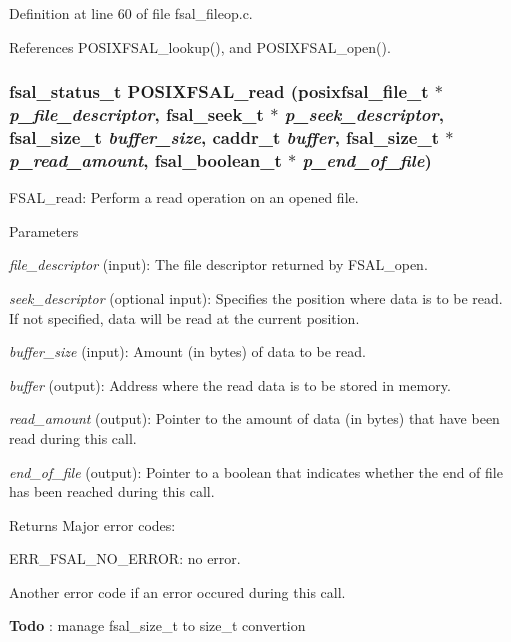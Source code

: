 Definition at line 60 of file fsal\_\-fileop.c.

References POSIXFSAL\_\-lookup(), and POSIXFSAL\_\-open().
\subsubsection[{POSIXFSAL\_\-read}]{\setlength{\rightskip}{0pt plus 5cm}fsal\_\-status\_\-t POSIXFSAL\_\-read (posixfsal\_\-file\_\-t $\ast$ {\em p\_\-file\_\-descriptor}, \/  fsal\_\-seek\_\-t $\ast$ {\em p\_\-seek\_\-descriptor}, \/  fsal\_\-size\_\-t {\em buffer\_\-size}, \/  caddr\_\-t {\em buffer}, \/  fsal\_\-size\_\-t $\ast$ {\em p\_\-read\_\-amount}, \/  fsal\_\-boolean\_\-t $\ast$ {\em p\_\-end\_\-of\_\-file})}\label{fsal__fileop_8c_adbed54d9e06272c3baad10998c2d51cf}
FSAL\_\-read: Perform a read operation on an opened file.


\begin{DoxyParams}{Parameters}
\item[{\em file\_\-descriptor}](input): The file descriptor returned by FSAL\_\-open. \item[{\em seek\_\-descriptor}](optional input): Specifies the position where data is to be read. If not specified, data will be read at the current position. \item[{\em buffer\_\-size}](input): Amount (in bytes) of data to be read. \item[{\em buffer}](output): Address where the read data is to be stored in memory. \item[{\em read\_\-amount}](output): Pointer to the amount of data (in bytes) that have been read during this call. \item[{\em end\_\-of\_\-file}](output): Pointer to a boolean that indicates whether the end of file has been reached during this call.\end{DoxyParams}
\begin{DoxyReturn}{Returns}
Major error codes:
\begin{DoxyItemize}
\item ERR\_\-FSAL\_\-NO\_\-ERROR: no error.
\item Another error code if an error occured during this call. 
\end{DoxyItemize}
\end{DoxyReturn}


\begin{Desc}
\item[{\bf Todo}]: manage fsal\_\-size\_\-t to size\_\-t convertion \end{Desc}



